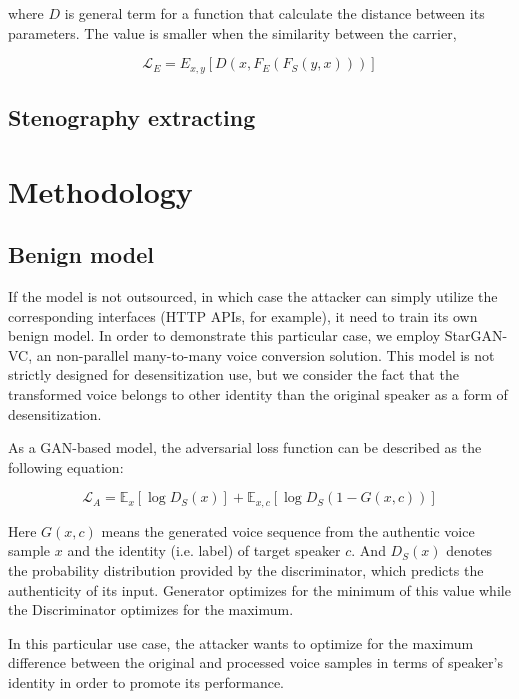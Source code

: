 \documentclass[journal]{IEEEtran} %
\begin{document}
where $D$ is general term for a function that calculate the distance between its parameters. The value is smaller when the similarity between the carrier, 

\begin{equation}
    \label{eqn:extract_loss}
    \mathcal{L}_E = E_{x, y}[D(x, F_E(F_S(y, x)))]
\end{equation}

\subsection{Stenography extracting}

\section{Methodology}

\subsection{Benign model}

If the model is not outsourced, in which case the attacker can simply utilize the corresponding interfaces (HTTP APIs, for example), it need to train its own benign model. In order to demonstrate this particular case, we employ StarGAN-VC\cite{a3}, an non-parallel many-to-many voice conversion solution. This model is not strictly designed for desensitization use, but we consider the fact that the transformed voice belongs to other identity than the original speaker as a form of desensitization.

As a GAN-based model, the adversarial loss function can be described as the following equation:

\begin{equation}
    \label{eqn:adv_loss}
    \mathcal{L}_A = \mathbb{E}_{x}[\log D_S(x)] + \mathbb{E}_{x, c}[\log D_S(1 - G(x, c))]
\end{equation}

Here $G(x, c)$ means the generated voice sequence from the authentic voice sample $x$ and the identity (i.e. label) of target speaker $c$. And $D_S(x)$ denotes the probability distribution provided by the discriminator, which predicts the authenticity of its input. Generator optimizes for the minimum of this value while the Discriminator optimizes for the maximum.

In this particular use case, the attacker wants to optimize for the maximum difference between the original and processed voice samples in terms of speaker's identity in order to promote its performance.
\end{document}
